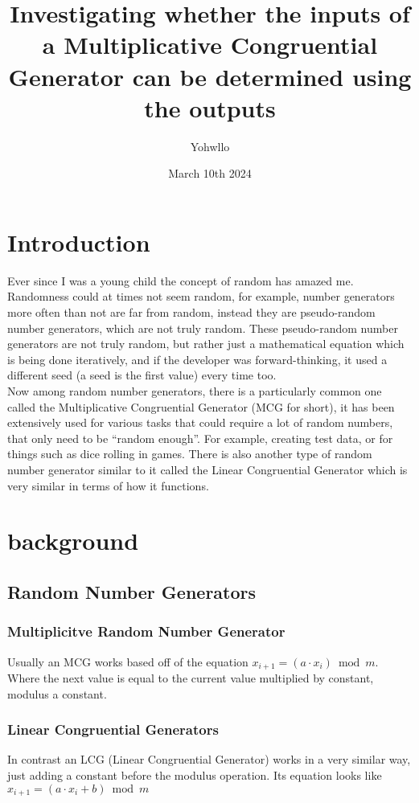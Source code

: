 \documentclass[12pft, english]{article}
\title{Investigating whether the inputs of a Multiplicative Congruential Generator can be determined using the outputs}
\author{Yohwllo}
\date{March 10th 2024}
\begin{document}
\maketitle

\tableofcontents
\pagebreak

\begin{multicols}{2}
  \section{Introduction}
  Ever since I was a young child the concept of random has amazed me. Randomness could at times not seem random, for example, number generators more often than not are far from random, instead they are pseudo-random number generators, which are not truly random. These pseudo-random number generators are not truly random, but rather just a mathematical equation which is being done iteratively, and if the developer was forward-thinking, it used a different seed (a seed is the first value) every time too. \\
  Now among random number generators, there is a particularly common one called the Multiplicative Congruential Generator (MCG for short), it has been extensively used for various tasks that could require a lot of random numbers, that only need to be ``random enough''. For example, creating test data, or for things such as dice rolling in games. There is also another type of random number generator similar to it called the Linear Congruential Generator which is very similar in terms of how it functions.
  \section{background}
  \subsection{Random Number Generators}
  \subsubsection{Multiplicitve Random Number Generator}
  Usually an MCG works based off of the equation \(x_{i+1} = (a \cdot x_{i}) \bmod m\). Where the next value is equal to the current value multiplied by constant, modulus a constant. \citep{waterlooMCG} \citep{fallOntoPlanes}
  \subsubsection{Linear Congruential Generators}
  In contrast an LCG (Linear Congruential Generator) works in a very similar way, just adding a constant before the modulus operation. Its equation looks like \(x_{i+1} = (a \cdot x_{i} +b ) \bmod m\) \citep{waterlooMCG}

\end{multicols}
\end{document}
